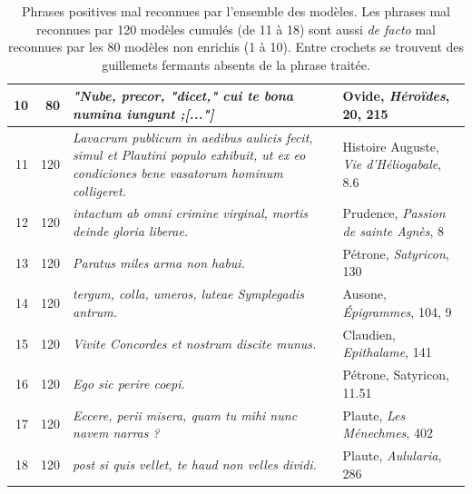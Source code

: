 \begin{table}[]
\begin{tabularx}{\textwidth}{|r|r|X|X|}
    10    & 80               & \textit{"Nube, precor, "dicet," cui te bona numina iungunt ;{[..."]}}    & Ovide, \textit{Héroïdes}, 20, 215                                                                            \\ \midrule
    11    & 120              & \textit{Lavacrum publicum in aedibus aulicis fecit, simul et Plautini populo exhibuit, ut ex eo condiciones bene vasatorum hominum colligeret.} & Histoire Auguste, \textit{Vie d'Héliogabale}, 8.6 \\
    12    & 120              & \textit{intactum ab omni crimine virginal, mortis deinde gloria liberae.} & Prudence, \textit{Passion de sainte Agnès}, 8                                                                       \\
    13    & 120              & \textit{Paratus miles arma non habui.} & Pétrone, \textit{Satyricon}, 130                                                                                        \\
    14    & 120              & \textit{tergum, colla, umeros, luteae Symplegadis antrum.} & Ausone, \textit{Épigrammes}, 104, 9                                                                                    \\
    15    & 120              & \textit{Vivite Concordes et nostrum discite munus.} & Claudien, \textit{Epithalame}, 141                                                                                              \\
    16    & 120              & \textit{Ego sic perire coepi.} & Pétrone, Satyricon, 11.51                                                                                                                   \\
    17    & 120              & \textit{Eccere, perii misera, quam tu mihi nunc navem narras ?} & Plaute, \textit{Les Ménechmes}, 402                                                                                 \\
    18    & 120              & \textit{post si quis vellet, te haud non velles dividi.} & Plaute, \textit{Aulularia}, 286                                                                                        \\ \bottomrule
    \end{tabularx}
    \caption{Phrases positives mal reconnues par l'ensemble des modèles. Les phrases mal reconnues par 120 modèles cumulés (de 11 à 18) sont aussi \textit{de facto} mal reconnues par les 80 modèles non enrichis  (1 à 10). Entre crochets se trouvent des guillemets fermants absents de la phrase traitée.}
    \label{tab:chap4:erreurscommunes}
\end{table}

